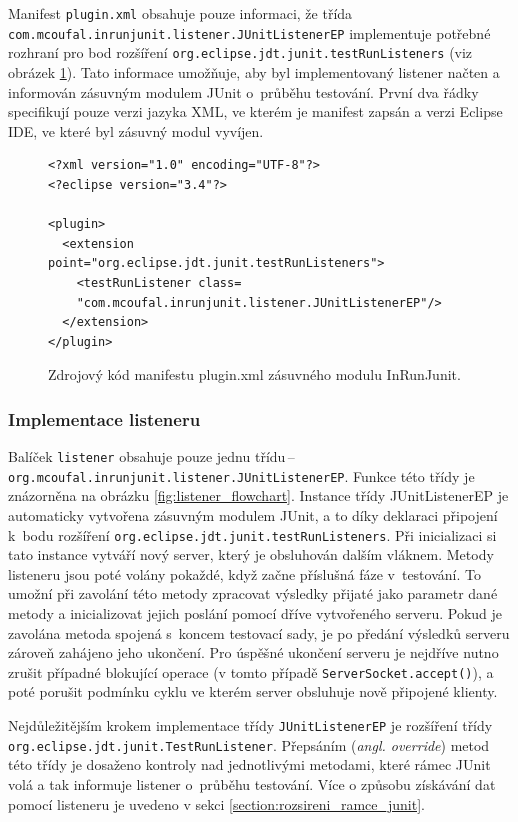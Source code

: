 	Manifest \texttt{plugin.xml} obsahuje pouze informaci, že třída \texttt{com.\-mcoufal.\-inrunjunit.\-listener.\-JUnitListenerEP} implementuje potřebné rozhraní pro bod rozšíření \texttt{org.\-eclipse.\-jdt.\-junit.\-testRunListeners} (viz obrázek \ref{code:plugin.xml}). Tato informace umožňuje, aby byl implementovaný listener načten a informován zásuvným modulem JUnit o~průběhu testování. První dva řádky specifikují pouze verzi jazyka XML, ve kterém je manifest zapsán a verzi Eclipse IDE, ve které byl zásuvný modul vyvíjen.  

	\lstset{language=xml}
	\begin{figure}
	  \begin{lstlisting}[frame=single]
<?xml version="1.0" encoding="UTF-8"?>
<?eclipse version="3.4"?>

<plugin>
  <extension point="org.eclipse.jdt.junit.testRunListeners">
    <testRunListener class=
    "com.mcoufal.inrunjunit.listener.JUnitListenerEP"/>
  </extension>
</plugin>
	  \end{lstlisting}
	  \caption{Zdrojový kód manifestu plugin.xml zásuvného modulu InRunJunit.}
	  \label{code:plugin.xml}
	\end{figure}

      \subsubsection{Implementace listeneru}
	Balíček \texttt{listener} obsahuje pouze jednu třídu\,--\,\texttt{org.\-mcoufal.\-inrunjunit.\-listener.\-JUnitListenerEP}. Funkce této třídy je znázorněna na obrázku \ref{fig:listener_flowchart}. Instance třídy JUnitListenerEP je automaticky vytvořena zásuvným modulem JUnit, a to díky deklaraci připojení k~bodu rozšíření \texttt{org.\-eclipse.\-jdt.\-junit.\-testRunListeners}. Při inicializaci si tato instance vytváří nový server, který je obsluhován dalším vláknem. Metody listeneru jsou poté volány pokaždé, když začne příslušná fáze v~testování. To umožní při zavolání této metody zpracovat výsledky přijaté jako parametr dané metody a inicializovat jejich poslání pomocí dříve vytvořeného serveru. Pokud je zavolána metoda spojená s~koncem testovací sady, je po předání výsledků serveru zároveň zahájeno jeho ukončení. Pro úspěšné ukončení serveru je nejdříve nutno zrušit případné blokující operace (v tomto případě \texttt{ServerSocket.accept()}), a poté porušit podmínku cyklu ve kterém server obsluhuje nově připojené klienty.
	
	Nejdůležitějším krokem implementace třídy \texttt{JUnitListenerEP} je rozšíření třídy \texttt{org.\-eclipse.\-jdt.\-junit.\-TestRunListener}. Přepsáním (\emph{angl. override}) metod této třídy je dosaženo kontroly nad jednotlivými metodami, které rámec JUnit volá a tak informuje listener o~průběhu testování. Více o způsobu získávání dat pomocí listeneru je uvedeno v sekci \ref{section:rozsireni_ramce_junit}.
	
